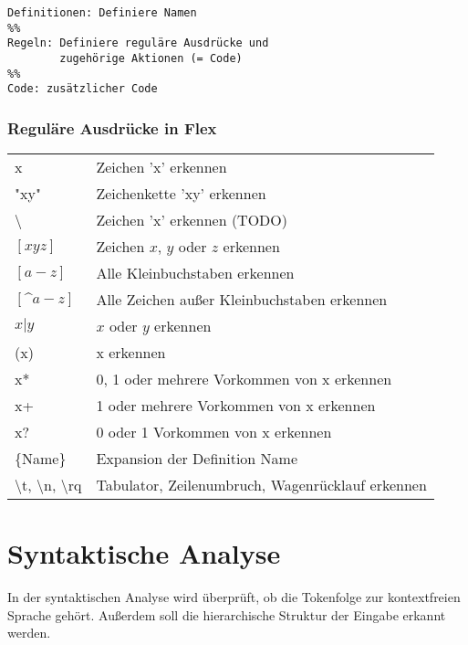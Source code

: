 \begin{verbatim}
Definitionen: Definiere Namen
%%
Regeln: Definiere reguläre Ausdrücke und 
        zugehörige Aktionen (= Code)
%%
Code: zusätzlicher Code
\end{verbatim}

\subsubsection{Reguläre Ausdrücke in Flex}
\begin{table}
    \begin{tabular}{ll}
    x          & Zeichen 'x' erkennen                             \\
    "xy"       & Zeichenkette 'xy' erkennen                       \\
    \textbackslash & Zeichen 'x' erkennen (TODO)                      \\
    $[xyz]$    & Zeichen $x$, $y$ oder $z$ erkennen         \\
    $[a-z]$    & Alle Kleinbuchstaben erkennen                    \\
    $[\^a-z]$  & Alle Zeichen außer Kleinbuchstaben erkennen      \\
    $x|y$      & $x$ oder $y$ erkennen                        \\
    (x)        & x erkennen                                       \\
    x*         & 0, 1 oder mehrere Vorkommen von x erkennen       \\
    x+         & 1 oder mehrere Vorkommen von x erkennen          \\
    x?         & 0 oder 1 Vorkommen von x erkennen                \\
    \{Name\}   & Expansion der Definition Name                    \\
    \textbackslash t, \textbackslash n, \textbackslash rq & Tabulator, Zeilenumbruch, Wagenrücklauf erkennen \\
    \end{tabular}
\end{table}



\section{Syntaktische Analyse}%
In der syntaktischen Analyse wird überprüft, ob die Tokenfolge zur 
kontextfreien Sprache gehört. Außerdem soll die 
hierarchische Struktur der Eingabe erkannt werden.

